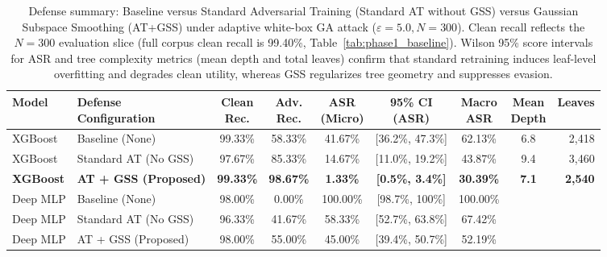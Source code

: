 \documentclass[iicol,pdflatex,sn-mathphys-num]{sn-jnl}
\begin{document}
\begin{table}[htbp]
\centering
\scriptsize
\setlength{\tabcolsep}{2.5pt}
\caption{Defense summary: Baseline versus Standard Adversarial Training (Standard AT without GSS) versus Gaussian Subspace Smoothing (AT+GSS) under adaptive white-box GA attack ($\varepsilon = 5.0, N=300$). Clean recall reflects the $N=300$ evaluation slice (full corpus clean recall is 99.40\%, Table~\ref{tab:phase1_baseline}). Wilson 95\% score intervals for ASR and tree complexity metrics (mean depth and total leaves) confirm that standard retraining induces leaf-level overfitting and degrades clean utility, whereas GSS regularizes tree geometry and suppresses evasion.}
\label{tab:phase4_defense}
\begin{tabular*}{\textwidth}{@{\extracolsep{\fill}}llccccccr}
\toprule
\textbf{Model} & \makecell{\textbf{Defense}\\\textbf{Configuration}} & \makecell{\textbf{Clean}\\\textbf{Rec.}} & \makecell{\textbf{Adv.}\\\textbf{Rec.}} & \makecell{\textbf{ASR}\\\textbf{(Micro)}} & \makecell{\textbf{95\% CI}\\\textbf{(ASR)}} & \makecell{\textbf{Macro}\\\textbf{ASR}} & \makecell{\textbf{Mean}\\\textbf{Depth}} & \textbf{Leaves} \\
\midrule
XGBoost & Baseline (None) & 99.33\% & 58.33\% & 41.67\% & [36.2\%, 47.3\%] & 62.13\% & 6.8 & 2,418 \\
XGBoost & Standard AT (No GSS) & 97.67\% & 85.33\% & 14.67\% & [11.0\%, 19.2\%] & 43.87\% & 9.4 & 3,460 \\
\textbf{XGBoost} & \textbf{AT + GSS (Proposed)} & \textbf{99.33\%} & \textbf{98.67\%} & \textbf{1.33\%} & \textbf{[0.5\%, 3.4\%]} & \textbf{30.39\%} & \textbf{7.1} & \textbf{2,540} \\
\midrule
Deep MLP & Baseline (None) & 98.00\% & 0.00\% & 100.00\% & [98.7\%, 100\%] & 100.00\% & \textendash{} & \textendash{} \\
Deep MLP & Standard AT (No GSS) & 96.33\% & 41.67\% & 58.33\% & [52.7\%, 63.8\%] & 67.42\% & \textendash{} & \textendash{} \\
Deep MLP & AT + GSS (Proposed) & 98.00\% & 55.00\% & 45.00\% & [39.4\%, 50.7\%] & 52.19\% & \textendash{} & \textendash{} \\
\bottomrule
\end{tabular*}
\end{table}
\end{document}
